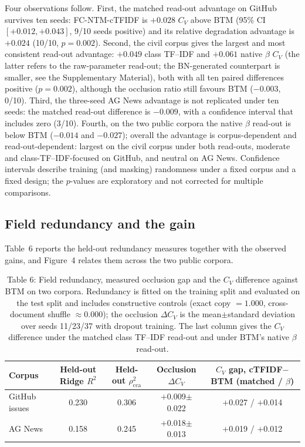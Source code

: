 \documentclass{article}
\begin{document}
Four observations follow. First, the matched read-out advantage on GitHub survives ten seeds:
FC-NTM-cTFIDF is $+0.028$ $C_V$ above BTM (95\% CI $[+0.012,+0.043]$, 9/10 seeds positive) and
its relative degradation advantage is $+0.024$ (10/10, $p=0.002$). Second, the civil corpus gives
the largest and most consistent read-out advantage: $+0.049$ class TF--IDF and $+0.061$ native
$\beta$ $C_V$ (the latter refers to the raw-parameter read-out; the BN-generated counterpart
is smaller, see the Supplementary Material), both with all ten paired differences positive
($p=0.002$), although the occlusion
ratio still favours BTM ($-0.003$, 0/10). Third, the three-seed AG News advantage is not replicated under ten seeds: the matched read-out difference is $-0.009$, with a confidence interval that includes zero (3/10). Fourth, on the
two public corpora the native $\beta$ read-out is below BTM ($-0.014$ and $-0.027$); overall the
advantage is corpus-dependent and read-out-dependent: largest on the civil corpus under both
read-outs, moderate and class-TF--IDF-focused on GitHub, and neutral on AG News. Confidence intervals
describe training (and masking) randomness under a fixed corpus and a fixed design; the $p$-values
are exploratory and not corrected for multiple comparisons.

\subsection{Field redundancy and the gain}

Table~6 reports the held-out redundancy measures together with the observed
gains, and Figure~4 relates them across the two public corpora.

\begin{table}[t]
\centering
\caption{Table 6: Field redundancy, measured occlusion gap and the $C_V$ difference against BTM on two corpora. Redundancy is fitted on the training split and evaluated on the test split and includes constructive controls (exact copy $=1.000$, cross-document shuffle $\approx0.000$); the occlusion $\Delta C_V$ is the mean$\pm$standard deviation over seeds 11/23/37 with dropout training. The last column gives the $C_V$ difference under the matched class TF--IDF read-out and under BTM's native $\beta$ read-out.}
\label{tab:conditional}
\footnotesize
\setlength{\tabcolsep}{4pt}
\begin{tabular}{@{}lcccc@{}}
\toprule
Corpus & Held-out Ridge $R^2$ & Held-out $\rho^2_{\mathrm{cca}}$
 & Occlusion $\Delta C_V$ & $C_V$ gap, cTFIDF$-$BTM (matched / $\beta$) \\
\midrule
GitHub issues & 0.230 & 0.306 & $+$0.009$\pm$0.022 & $+$0.027 / $+$0.014 \\
AG News & 0.158 & 0.245 & $+$0.018$\pm$0.013 & $+$0.019 / $+$0.012 \\
\bottomrule
\end{tabular}
\end{table}
\end{document}
